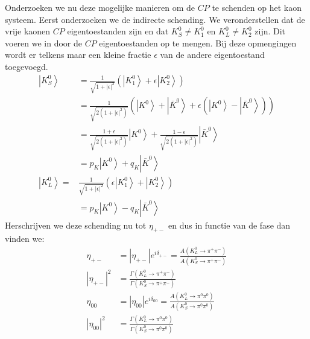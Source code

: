 \documentclass[../main.tex]{subfiles}
\begin{document}
Onderzoeken we nu deze mogelijke manieren om de $CP$ te schenden op het kaon systeem. Eerst onderzoeken we de indirecte schending. We veronderstellen dat de vrije kaonen $CP$ eigentoestanden zijn en dat $K_S^0\neq K_1^0$ en $K_L^0\neq K_2^0$ zijn. Dit voeren we in door de $CP$ eigentoestanden op te mengen. Bij deze opmengingen wordt er telkens maar een kleine fractie $\epsilon$ van de andere eigentoestand toegevoegd.
\begin{equation}
    \begin{aligned}
        \label{eq:kaon_indirecte_cp_violation_1}
        \left| K_{S}^{0}\right>&=\frac{1}{\sqrt{1+|\epsilon|^{2}}}\left(\left|K_{1}^{0}\right>+\epsilon\left| K_{2}^{0} \right>\right) \\
                               &=\frac{1}{\sqrt{2\left(1+|\epsilon|^{2}\right)}}\left(\left|K^{0}\right>+\left| \bar{K}^{0}\right>+\epsilon\left(\left|K^{0}\right>-\left| \bar{K}^{0}\right>\right)\right) \\
                               &=\frac{1+\epsilon}{\sqrt{2\left(1+|\epsilon|^{2}\right)}}\left|K^{0}\right>+\frac{1-\epsilon}{\sqrt{2\left(1+|\epsilon|^{2}\right)}}\left| \bar{K}^{0}\right>\\
                               &=p_{K}\left|K^{0}\right>+q_{K}\left| \bar{K}^{0}\right>\\
        \left| K_{L}^{0}\right>=& \frac{1}{\sqrt{1+|\epsilon|^{2}}}\left(\epsilon\left|K_{1}^{0}\right>+\left| K_{2}^{0}\right>\right) \\
                                &=p_{K}\left|K^{0}\right>-q_{K}\left| \bar{K}^{0}\right>
    \end{aligned}
\end{equation}
Herschrijven we deze schending nu tot $\eta_{+-}$ en dus in functie van de fase dan vinden we:
\begin{equation}
    \begin{aligned}
        \label{eq:kaon_indirecte_cp_violation_2}
        \eta_{+-} &=\left|\eta_{+-}\right| e^{i \delta_{+-}}=\frac{A\left(K_{L}^{0} \rightarrow \pi^{+} \pi^{-}\right)}{A\left(K_{S}^{0} \rightarrow \pi^{+} \pi^{-}\right)} \\
        \left|\eta_{+-}\right|^{2} &=\frac{\Gamma\left(K_{L}^{0} \rightarrow \pi^{+} \pi^{-}\right)}{\Gamma\left(K_{S}^{0} \rightarrow \pi^{+} \pi^{-}\right)} \\
        \eta_{00} &=\left|\eta_{00}\right| e^{i \delta_{00}}=\frac{A\left(K_{L}^{0} \rightarrow \pi^{0} \pi^{0}\right)}{A\left(K_{S}^{0} \rightarrow \pi^{0} \pi^{0}\right)} \\
        \left|\eta_{00}\right|^{2} &=\frac{\Gamma\left(K_{L}^{0} \rightarrow \pi^{0} \pi^{0}\right)}{\Gamma\left(K_{S}^{0} \rightarrow \pi^{0} \pi^{0}\right)}
    \end{aligned}
\end{equation}
\end{document}
